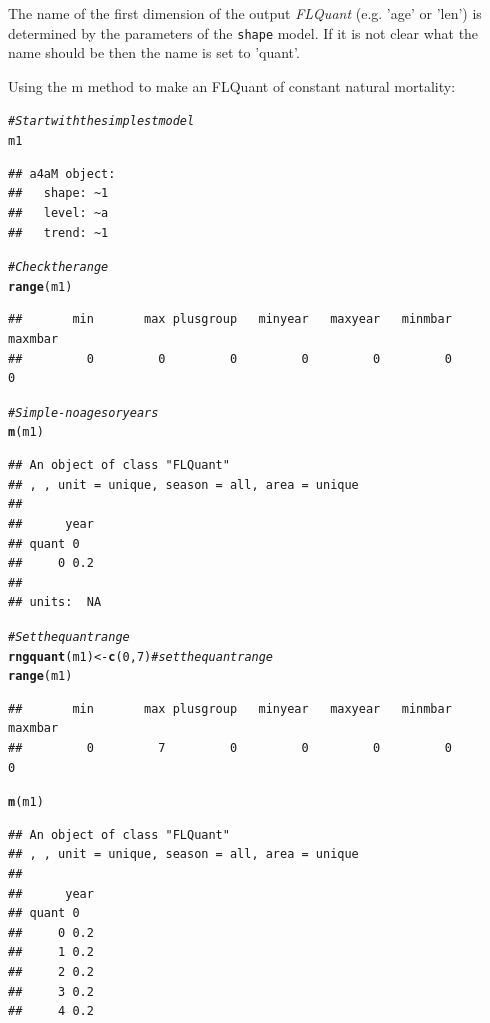 \documentclass[a4paper,english,10pt]{article}\usepackage[]{graphicx}\usepackage[]{color}
\makeatletter
\newcommand{\hlnum}[1]{\textcolor[rgb]{0.686,0.059,0.569}{#1}}%
\newcommand{\hlcom}[1]{\textcolor[rgb]{0.678,0.584,0.686}{\textit{#1}}}%
\newcommand{\hlstd}[1]{\textcolor[rgb]{0.345,0.345,0.345}{#1}}%
\newcommand{\hlkwb}[1]{\textcolor[rgb]{0.69,0.353,0.396}{#1}}%
\newcommand{\hlkwd}[1]{\textcolor[rgb]{0.737,0.353,0.396}{\textbf{#1}}}%
\newenvironment{kframe}{%
 \def\at@end@of@kframe{}%
 \ifinner\ifhmode%
  \def\at@end@of@kframe{\end{minipage}}%
  \begin{minipage}{\columnwidth}%
 \fi\fi%
 \def\FrameCommand##1{\hskip\@totalleftmargin \hskip-\fboxsep
 \colorbox{shadecolor}{##1}\hskip-\fboxsep
     \hskip-\linewidth \hskip-\@totalleftmargin \hskip\columnwidth}%
 \MakeFramed {\advance\hsize-\width
   \@totalleftmargin\z@ \linewidth\hsize
   \@setminipage}}%
 {\par\unskip\endMakeFramed%
 \at@end@of@kframe}
\newenvironment{knitrout}{}{} %
\newcommand{\code}[1]{{\texttt{#1}}}
\newcommand{\class}[1]{{\textit{#1}}}
\makeatother
\begin{document}
The name of the first dimension of the output \class{FLQuant} (e.g. 'age' or 'len') is determined by the parameters of the \code{shape} model. If it is not clear what the name should be then the name is set to 'quant'.

Using the m method to make an FLQuant of constant natural mortality:

\begin{knitrout}
\color{fgcolor}\begin{kframe}
\begin{alltt}
\hlcom{# Start with the simplest model}
\hlstd{m1}
\end{alltt}
\begin{verbatim}
## a4aM object:
##   shape: ~1
##   level: ~a
##   trend: ~1
\end{verbatim}
\begin{alltt}
\hlcom{# Check the range}
\hlkwd{range}\hlstd{(m1)}
\end{alltt}
\begin{verbatim}
##       min       max plusgroup   minyear   maxyear   minmbar   maxmbar 
##         0         0         0         0         0         0         0
\end{verbatim}
\begin{alltt}
\hlcom{# Simple - no ages or years}
\hlkwd{m}\hlstd{(m1)}
\end{alltt}
\begin{verbatim}
## An object of class "FLQuant"
## , , unit = unique, season = all, area = unique
## 
##      year
## quant 0  
##     0 0.2
## 
## units:  NA
\end{verbatim}
\begin{alltt}
\hlcom{# Set the quant range}
\hlkwd{rngquant}\hlstd{(m1)} \hlkwb{<-} \hlkwd{c}\hlstd{(}\hlnum{0}\hlstd{,} \hlnum{7}\hlstd{)}  \hlcom{# set the quant range}
\hlkwd{range}\hlstd{(m1)}
\end{alltt}
\begin{verbatim}
##       min       max plusgroup   minyear   maxyear   minmbar   maxmbar 
##         0         7         0         0         0         0         0
\end{verbatim}
\begin{alltt}
\hlkwd{m}\hlstd{(m1)}
\end{alltt}
\begin{verbatim}
## An object of class "FLQuant"
## , , unit = unique, season = all, area = unique
## 
##      year
## quant 0  
##     0 0.2
##     1 0.2
##     2 0.2
##     3 0.2
##     4 0.2

\end{verbatim}
\end{kframe}
\end{knitrout}
\end{document}
